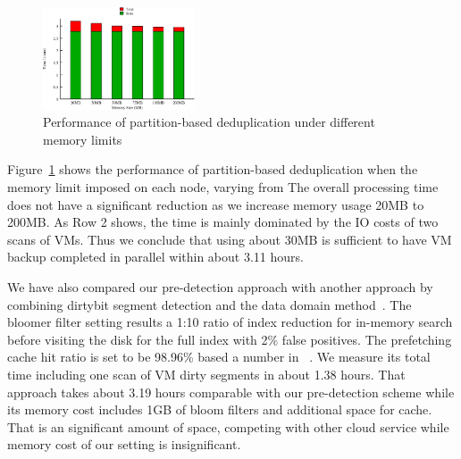 
\begin{figure}
\centering
\includegraphics[width=0.4\textwidth]{mem_time.eps}
\caption{Performance of partition-based deduplication under different memory limits}
\label{fig:memory}
\end{figure}


Figure~\ref{fig:memory} shows the performance of partition-based deduplication when 
the memory limit imposed on each node, varying from 
The overall processing time does not have a significant reduction as we increase memory usage  20MB to 200MB.
As Row 2 shows, the time is mainly dominated by  the IO costs of two scans of VMs.
Thus we conclude that using about 30MB is sufficient to have VM backup completed in parallel within about 3.11 hours.




We have also compared our pre-detection approach with another approach by combining
dirtybit segment  detection and  the data domain method~\cite{bottleneck08}. 
The bloomer filter setting  results a 1:10 ratio of index reduction for in-memory search before visiting
the disk for the full index with 2\% false positives. The prefetching cache hit ratio is set to be 98.96\% based
a number in ~\cite{bottleneck08}.
We measure its  total time including one scan of VM dirty segments in about 1.38 hours.
That approach takes about 3.19 hours comparable with our pre-detection scheme while its memory cost
includes 1GB of bloom filters and additional space for cache. That is an significant amount of space,
competing with other cloud service while memory cost of our setting is  insignificant.
 
